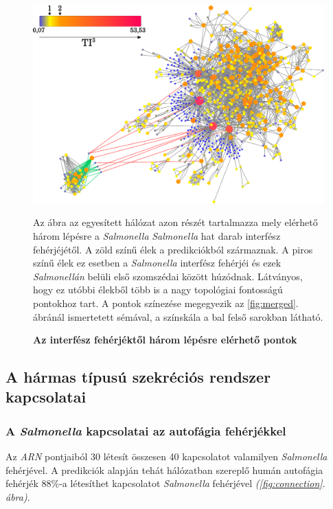 \documentclass[a4paper,12pt]{article}
\newenvironment{imgdesc}{
		\small
		\singlespacing
		\begin{center}
		
	}{
		\end{center}	
	}
\begin{document}
	
						\begin{figure}[H]
							\includegraphics[scale=0.50]{img/merged-3-step-from-connecting-salmonella.pdf}
							\centering
							\caption{ \textbf{Az interfész fehérjéktől három lépésre elérhető pontok}}
							\begin{imgdesc}
								Az ábra az egyesített hálózat azon részét tartalmazza mely elérhető három lépésre a \textit{Salmonella} \textit{Salmonella} hat darab interfész fehérjéjétől. A zöld színű élek a predikciókból származnak. A piros színű élek ez esetben a \textit{Salmonella} interfész fehérjéi és ezek \textit{Salmonellán} belüli első szomszédai között húzódnak. Látványos, hogy ez utóbbi élekből több is a nagy topológiai fontosságú pontokhoz tart. A pontok színezése megegyezik az \ref{fig:merged}. ábránál ismertetett sémával, a színskála a bal felső sarokban látható.
							\end{imgdesc}			
							\label{fig:merged-3-step}			 		 
						\end{figure}			
		
	\subsection{A hármas típusú szekréciós rendszer kapcsolatai}	
		
		\subsubsection{A \textit{Salmonella} kapcsolatai az autofágia fehérjékkel}
		
		Az \textit{ARN} pontjaiból 30 létesít összesen 40 kapcsolatot valamilyen \textit{Salmonella} fehérjével. A predikciók alapján tehát hálózatban szereplő humán autofágia fehérjék 88\%-a létesíthet kapcsolatot \textit{Salmonella} fehérjével \textit{(\ref{fig:connection}. ábra)}.
		
\end{document}
